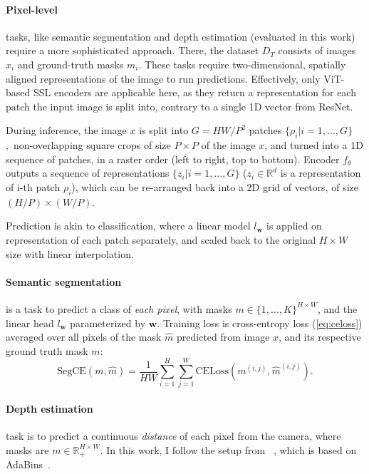 \paragraph{Pixel-level} tasks, like semantic segmentation and depth estimation (evaluated in this work) require a more sophisticated approach. There, the dataset $D_T$ consists of images $x_i$ and ground-truth masks $m_i$. These tasks require two-dimensional, spatially aligned representations of the image to run predictions. Effectively, only ViT-based SSL encoders are applicable here, as they return a representation for each patch the input image is split into, contrary to a single 1D vector from ResNet. 

During inference, the image $x$ is split into $G=HW/P^2$ patches $\{\rho_i|i=1,...,G\}$,~\ie non-overlapping square crops of size $P\times P$ of the image $x$, and turned into a 1D sequence of patches, in a raster order (left to right, top to bottom). Encoder $f_\theta$ outputs a sequence of representations $\{z_i|i=1,...,G\}$ ($z_i\in\mathbb{R}^d$ is a representation of i-th patch $\rho_i$), which can be re-arranged back into a 2D grid of vectors, of size $(H/P)\times(W/P)$.

Prediction is akin to classification, where a linear model $l_\mathbf{w}$ is applied on representation of each patch separately, and scaled back to the original $H\times W$ size with linear interpolation.

\paragraph{Semantic segmentation} is a task to predict a class of \textit{each pixel}, with masks $m\in\{1,...,K\}^{H\times W}$, and the linear head $l_{\mathbf{w}}$ parameterized by $\mathbf{w}$. Training loss is cross-entropy loss (\cref{eq:celoss}) averaged over all pixels of the mask $\hat{m}$ predicted from image $x$, and its respective ground truth mask $m$:
\begin{equation}
    \text{SegCE}(m,\hat{m})=\frac{1}{HW}\sum_{i=1}^{H}\sum_{j=1}^{W}\text{CELoss}(m^{(i,j)},\hat{m}^{(i,j)})\text{.}
    \label{eq:seg_celoss}
\end{equation}

\paragraph{Depth estimation} task is to predict a continuous \textit{distance} of each pixel from the camera, where masks are $m\in\mathbb{R}_+^{H\times W}$. In this work, I follow the setup from \DINOvtwo~\cite{dinov2}, which is based on AdaBins~\cite{adabins}. 

